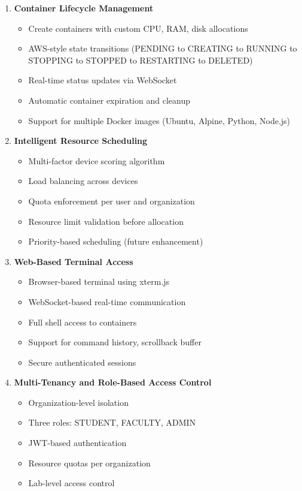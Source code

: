 \documentclass[12pt,a4paper]{article}
\begin{document}
\begin{enumerate}[noitemsep]
    \item \textbf{Container Lifecycle Management}
    \begin{itemize}[noitemsep]
        \item Create containers with custom CPU, RAM, disk allocations
        \item AWS-style state transitions (PENDING to CREATING to RUNNING to STOPPING to STOPPED to RESTARTING to DELETED)
        \item Real-time status updates via WebSocket
        \item Automatic container expiration and cleanup
        \item Support for multiple Docker images (Ubuntu, Alpine, Python, Node.js)
    \end{itemize}
    
    \item \textbf{Intelligent Resource Scheduling}
    \begin{itemize}[noitemsep]
        \item Multi-factor device scoring algorithm
        \item Load balancing across devices
        \item Quota enforcement per user and organization
        \item Resource limit validation before allocation
        \item Priority-based scheduling (future enhancement)
    \end{itemize}
    
    \item \textbf{Web-Based Terminal Access}
    \begin{itemize}[noitemsep]
        \item Browser-based terminal using xterm.js
        \item WebSocket-based real-time communication
        \item Full shell access to containers
        \item Support for command history, scrollback buffer
        \item Secure authenticated sessions
    \end{itemize}
    
    \item \textbf{Multi-Tenancy and Role-Based Access Control}
    \begin{itemize}[noitemsep]
        \item Organization-level isolation
        \item Three roles: STUDENT, FACULTY, ADMIN
        \item JWT-based authentication
        \item Resource quotas per organization
        \item Lab-level access control
    \end{itemize}
    

\end{enumerate}
\end{document}
